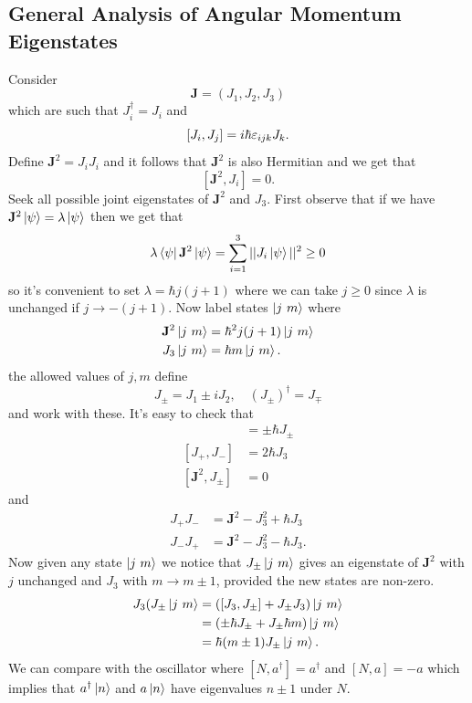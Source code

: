 \documentclass{article}
\begin{document}
\subsection{General Analysis of Angular Momentum Eigenstates}
Consider
\[
  \mathbf J = (J_1,J_2,J_3)
\]
which are such that $ J_i^\dagger = J_i $ and
\[
	[J_i,J_j] = i\hbar \varepsilon_{ijk} J_k.
\]
Define $ \mathbf J^2 = J_iJ_i $ and it follows that $ \mathbf J^2 $ is also Hermitian and we get that
\[
	[\mathbf J^2, J_i] = 0.
\]
Seek all possible joint eigenstates of $ \mathbf J^2 $ and $ J_3 $. First observe that if we have $ \mathbf J^2 \ket \psi = \lambda \ket \psi $ then we get that
\[
	\lambda \bra \psi \mathbf J^2 \ket \psi = \sum_{i=1}^3 ||J_i\ket\psi||^2 \ge 0
\]
so it's convenient to set $ \lambda = \hbar j(j+1) $ where we can take $ j\ge 0 $ since $ \lambda $ is unchanged if $ j \to -(j+1) $. Now label states $ \ket {j \ m} $ where
\begin{align*}
	\mathbf J^2\ket{j \ m} &= \hbar^2 j(j+1) \ket{j \ m} \\
	J_3\ket{j \ m} &= \hbar m\ket{j \ m}.
\end{align*}
the allowed values of $ j, m $ define 
\[
J_\pm = J_1 \pm iJ_2,\quad (J_\pm)^\dagger = J_\mp
\]
and work with these. It's easy to check that 
\begin{align*}
	[J_3, J_\pm] &= \pm \hbar J_\pm\\
	[J_+, J_-] &= 2\hbar J_3 \\
	[\mathbf J^2, J_\pm] &= 0
\end{align*}
and
\begin{align*}
	J_+J_- &= \mathbf J^2 - J_3^2 + \hbar J_3 \\
	J_-J_+ &= \mathbf J^2 - J_3^2 - \hbar J_3.
\end{align*}
Now given any state $ \ket{j \ m } $ we notice that $ J_\pm \ket{j \ m} $ gives an eigenstate of $ \mathbf J^2 $ with $ j $ unchanged and $ J_3 $ with $ m\to m\pm 1 $, provided the new states are non-zero.
\begin{align*}
	J_3(J_\pm \ket{j \ m} &= ([J_3, J_\pm] + J_\pm J_3)\ket{j\ m} \\
			      &= ( \pm \hbar J_\pm + J_\pm \hbar m) \ket{j\ m} \\
			      &= \hbar (m\pm 1) J_\pm \ket{j\ m}.
\end{align*}
We can compare with the oscillator where $ [N,a^\dagger] = a^\dagger $ and $ [N,a] =-a $ which implies that $ a^\dagger \ket n  $ and $ a\ket n $ have eigenvalues $ n\pm 1 $ under $ N $.\par
\end{document}
